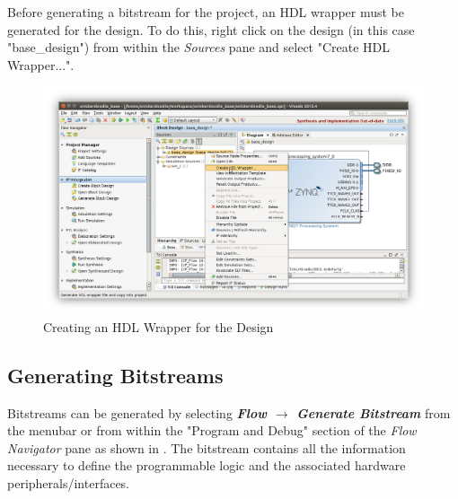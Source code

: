 Before generating a bitstream for the project, an HDL wrapper must be generated for the design. To do this, right click on the design (in this case "base\_design") from within the \textit{Sources} pane and select "Create HDL Wrapper...". 


\begin{figure}
	\centering
	\includegraphics{images/Create_HDL_Wrapper.png}
	\caption{Creating an HDL Wrapper for the Design}
	\label{fig:createhdlwrapper}
\end{figure}


\subsection{Generating Bitstreams}

Bitstreams can be generated by selecting \textit{\bfseries Flow $\rightarrow$ Generate Bitstream} from the menubar or from within the "Program and Debug" section of the \textit{Flow Navigator} pane as shown in . The bitstream contains all the information necessary to define the programmable logic and the associated hardware peripherals/interfaces.

